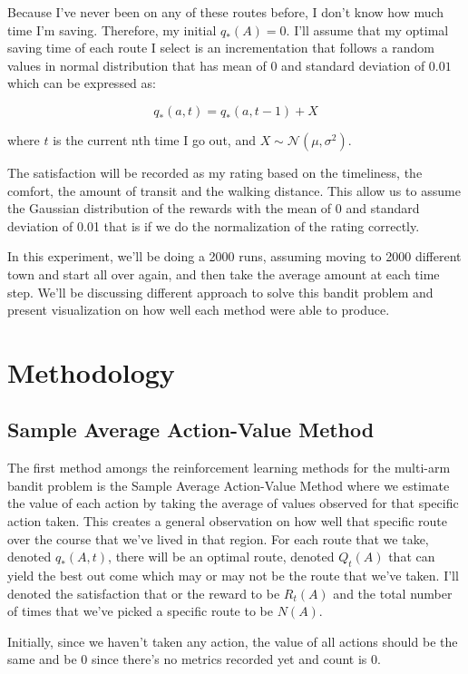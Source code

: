 \documentclass{article}
\begin{document}
Because I've never been on any of these routes before, I don't know how much
time I'm saving. Therefore, my initial $q_*(A) = 0$. I'll assume that my
optimal saving time of each route I select is an incrementation that follows a random values in normal distribution that
has mean of $0$ and standard deviation of $0.01$ which can be expressed as:

\[
	q_*(a, t) = q_*(a, t-1) + X
\]

where $t$ is the current nth time I go out, and $X \sim \mathcal{N}(\mu,
	\sigma^2)$.

The satisfaction will be recorded as my rating based on the timeliness, the
comfort, the amount of transit and the walking distance. This allow us to assume the Gaussian distribution of the rewards with the
mean of 0 and standard deviation of 0.01 that is if we do the normalization of
the rating correctly.

In this experiment, we'll be doing a 2000 runs, assuming moving to 2000
different town and start all over again, and then take the average amount
at each time step. We'll be discussing different approach to solve this bandit
problem and present visualization on how well each method were able to produce.

\section{Methodology}
\subsection{Sample Average Action-Value Method}
The first method amongs the reinforcement learning methods for the multi-arm
bandit problem is the Sample Average Action-Value Method where we estimate the
value of each action by taking the average of values observed for that specific
action taken. This creates a general observation on how well that specific route
over the course that we've lived in that region. For each route that we take,
denoted $q_*(A, t)$, there will be an optimal route, denoted $Q_t(A)$ that can yield the best out
come which may or may not be the route that we've taken. I'll denoted the
satisfaction that or the reward to be $R_t(A)$ and the total number of times
that we've picked a specific route to be $N(A)$.

Initially, since we haven't taken any action, the value of all actions should be
the same and be $0$ since there's no metrics recorded yet and count is $0$.
\end{document}
